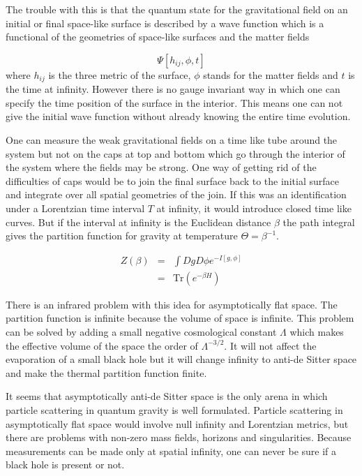 \documentclass[aps,prd,groupedaddress,showpacs]{revtex4}
\begin{document}
The trouble with this is that the quantum state for the gravitational field on an initial or final space-like surface is described by a wave function which is a functional of the geometries of space-like surfaces and the matter fields 

\begin{equation}
\Psi[h_{ij}, \phi, t]
\end{equation}
where $h_{ij}$ is the three metric of the surface, $\phi$ stands for the matter fields and $t$ is the time at infinity. 
However there is no gauge invariant way in which one can specify the time position of the surface in the interior. This means one can not give the initial wave function without already knowing the entire time evolution. 

One can measure the weak gravitational fields on a time like tube around the system but not on the caps at top and bottom which go through the interior of the system where the fields may be strong. One way of getting rid of the difficulties of caps would be to join the final surface back to the initial surface and integrate over all spatial geometries of the join.   If this was an identification under a Lorentzian time interval $T$ at infinity, it would introduce closed time like curves. But if the interval at infinity is the Euclidean  distance $\beta$ the path integral gives the partition function for gravity at temperature $\Theta=\beta^{-1}$.  

\begin{eqnarray}
Z(\beta)&=&\int DgD\phi e^{-I[g, \phi]}\nonumber \\
&=&\text{Tr}(e^{-\beta H})
\end{eqnarray}


There is an infrared problem with this idea for asymptotically flat space.  The partition function is infinite because the volume of space is infinite. This problem can be solved by adding a small negative cosmological constant $\Lambda$ which makes the effective volume of the space the order of $\Lambda^{-3/2}$. It will not affect the evaporation of a small black hole but it will change infinity to anti-de Sitter space and make the thermal partition function finite.

It seems that asymptotically anti-de Sitter space is the only arena in which particle scattering in quantum gravity is well formulated. Particle scattering in asymptotically flat space would involve null infinity and Lorentzian metrics, but there are problems with non-zero mass fields, horizons and singularities. Because measurements can be made only at spatial infinity, one can never be sure if a black hole is present or not. 
\end{document}
